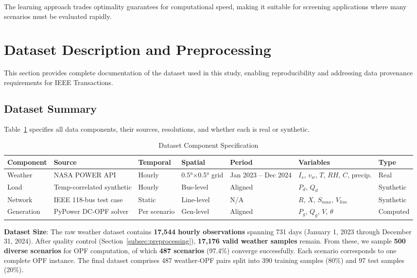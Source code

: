 \documentclass[journal,12pt,onecolumn]{IEEEtran}
\begin{document}
The learning approach trades optimality guarantees for computational speed, making it suitable for screening applications where many scenarios must be evaluated rapidly.

\section{Dataset Description and Preprocessing}
\label{sec:dataset}

This section provides complete documentation of the dataset used in this study, enabling reproducibility and addressing data provenance requirements for IEEE Transactions.

\subsection{Dataset Summary}

Table~\ref{tab:dataset_summary} specifies all data components, their sources, resolutions, and whether each is real or synthetic.

\begin{table}[htbp]
\caption{Dataset Component Specification}
\label{tab:dataset_summary}
\centering
\begin{tabular}{p{1.5cm}p{2.8cm}p{1.5cm}p{1.5cm}p{1.8cm}p{2.5cm}p{1.2cm}}
\toprule
\textbf{Component} & \textbf{Source} & \textbf{Temporal} & \textbf{Spatial} & \textbf{Period} & \textbf{Variables} & \textbf{Type} \\
\midrule
Weather & NASA POWER API & Hourly & 0.5°×0.5° grid & Jan 2023 -- Dec 2024 & $I_s$, $v_w$, $T$, $RH$, $C$, precip. & Real \\
Load & Temp-correlated synthetic & Hourly & Bus-level & Aligned & $P_d$, $Q_d$ & Synthetic \\
Network & IEEE 118-bus test case & Static & Line-level & N/A & $R$, $X$, $S_{max}$, $V_{lim}$ & Synthetic \\
Generation & PyPower DC-OPF solver & Per scenario & Gen-level & Aligned & $P_g$, $Q_g$, $V$, $\theta$ & Computed \\
\bottomrule
\end{tabular}
\end{table}

\textbf{Dataset Size}: The raw weather dataset contains \textbf{17,544 hourly observations} spanning 731 days (January 1, 2023 through December 31, 2024). After quality control (Section~\ref{subsec:preprocessing}), \textbf{17,176 valid weather samples} remain. From these, we sample \textbf{500 diverse scenarios} for OPF computation, of which \textbf{487 scenarios} (97.4\%) converge successfully. Each scenario corresponds to one complete OPF instance. The final dataset comprises 487 weather-OPF pairs split into 390 training samples (80\%) and 97 test samples (20\%).
\end{document}
